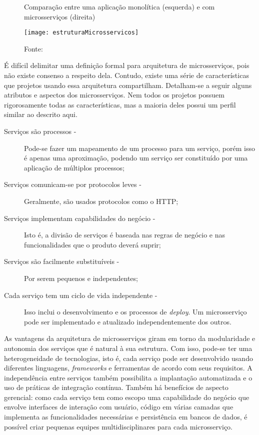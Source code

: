 \begin{figure}[H]
	\centering
	\caption{Comparação entre uma aplicação monolítica (esquerda) e com microsserviços (direita)}
  \texttt{[image: estruturaMicrosservicos]}
	\caption*{Fonte: \cite{lewis}}
\label{fig:estruturaMicrosservicos}
\end{figure}

É difícil delimitar uma definição formal para arquitetura de microsserviços, pois não existe consenso a respeito dela. Contudo, existe uma série de características que projetos usando essa arquitetura compartilham. Detalham-se a seguir alguns atributos e aspectos dos microsserviços. Nem todos os projetos possuem rigorosamente todas as características, mas a maioria deles possui um perfil similar ao descrito aqui.

\begin{description}
\item[Serviços são processos -]Pode-se fazer um mapeamento de um processo para um serviço, porém isso é apenas uma aproximação, podendo um serviço ser constituído por uma aplicação de múltiplos processos;
\item[Serviços comunicam-se por protocolos leves -]Geralmente, são usados protocolos como o HTTP;
\item[Serviços implementam capabilidades do negócio -]Isto é, a divisão de serviços é baseada nas regras de negócio e nas funcionalidades que o produto deverá suprir;
\item[Serviços são facilmente substituíveis - ]Por serem pequenos e independentes;
\item[Cada serviço tem um ciclo de vida independente -]Isso inclui o desenvolvimento e os processos de \emph{deploy}. Um microsserviço pode ser implementado e atualizado independentemente dos outros.
\end{description}

As vantagens da arquitetura de microsserviços giram em torno da modularidade e autonomia dos serviços que é natural à sua estrutura. Com isso, pode-se ter uma heterogeneidade de tecnologias, isto é, cada serviço pode ser desenvolvido usando diferentes linguagens, \textit{frameworks} e ferramentas de acordo com seus requisitos. A independência entre serviços também possibilita a implantação automatizada e o uso de práticas de integração contínua. Também há benefícios de aspecto gerencial: como cada serviço tem como escopo uma capabilidade do negócio que envolve interfaces de interação com usuário, código em várias camadas que implementa as funcionalidades necessárias e persistência em bancos de dados, é possível criar pequenas equipes multidisciplinares para cada microsserviço.

